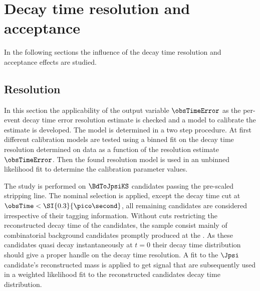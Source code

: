 
\section{Decay time resolution and acceptance}
\label{sec:measurement_of_sin2beta:resolution_and_acceptance}

In the following sections the influence of the decay time resolution and
acceptance effects are studied. 

\subsection{Resolution}
\label{sec:measurement_of_sin2beta:resolution_and_acceptance:resolution}

In this section the applicability of the \dtfpv output variable $\obsTimeError$ as
the per-event decay time error resolution estimate is checked and a model to
calibrate the estimate is developed. The model is determined in a two step
procedure. At first different calibration models are tested using a binned fit
on the decay time resolution determined on data as a function of the resolution
estimate $\obsTimeError$. Then the found resolution model is used in an unbinned
likelihood fit to determine the calibration parameter values.

The study is performed on $\BdToJpsiKS$ candidates passing the pre-scaled
stripping line. The nominal selection is applied, except the decay time cut at
$\obsTime < \SI{0.3}{\pico\second}$, all remaining candidates are considered
irrespective of their tagging information. Without cuts restricting the
reconstructed decay time of the \Bd candidates, the sample consist mainly of
combinatorial background candidates promptly produced at the \PV. As these
candidates quasi decay instantaneously at $t = 0$ their decay time distribution
should give a proper handle on the decay time resolution. A fit to the $\Jpsi$
candidate's reconstructed mass is applied to get signal \sweights that are
subsequently used in a weighted likelihood fit to the reconstructed \Bd
candidates decay time distribution.

